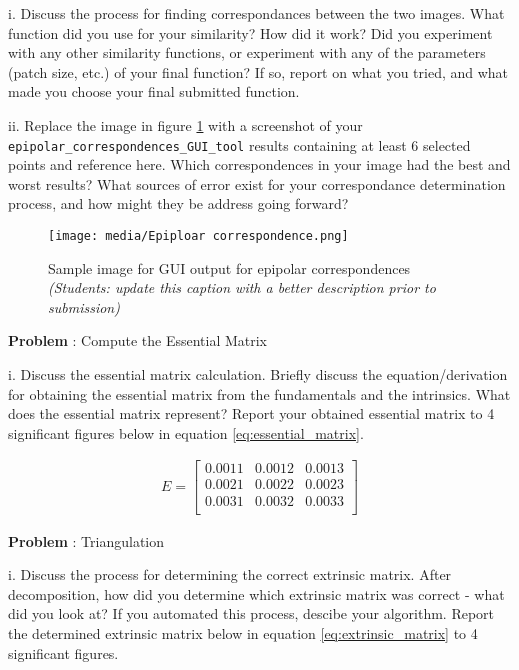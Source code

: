 \documentclass[onecolumn,10pt]{article}
\begin{document}
i. Discuss the process for finding correspondances between the two images. What function did you use for your similarity? How did it work? Did you experiment with any other similarity functions, or experiment with any of the parameters (patch size, etc.) of your final function? If so, report on what you tried, and what made you choose your final submitted function.

ii. Replace the image in figure \ref{fig:epipolar_corresp} with a screenshot of your {\tt epipolar\_correspondences\_GUI\_tool} results containing at least 6 selected points and reference here. Which correspondences in your image had the best and worst results? What sources of error exist for your correspondance determination process, and how might they be address going forward?

\begin{figure}
  \centering
  \texttt{[image: media/Epiploar correspondence.png]} %
  \caption{Sample image for GUI output for epipolar correspondences \textit{(Students: update this caption with a better description prior to submission)}}
  \label{fig:epipolar_corresp}
\end{figure}

\addtocounter{problemnumber}{1}
\noindent\textbf{Problem }:  Compute the Essential Matrix

i. Discuss the essential matrix calculation. Briefly discuss the equation/derivation for obtaining the essential matrix from the fundamentals and the intrinsics. What does the essential matrix represent? Report your obtained essential matrix to 4 significant figures below in equation \ref{eq:essential_matrix}.

\begin{align}
E=\begin{bmatrix}
0.0011 & 0.0012 & 0.0013 \\
0.0021 & 0.0022 & 0.0023 \\
0.0031 & 0.0032 & 0.0033 \\
\end{bmatrix}
\label{eq:essential_matrix}
\end{align}

\addtocounter{problemnumber}{1}
\noindent\textbf{Problem }:  Triangulation

i. Discuss the process for determining the correct extrinsic matrix. After decomposition, how did you determine which extrinsic matrix was correct - what did you look at? If you automated this process, descibe your algorithm. Report the determined extrinsic matrix below in equation \ref{eq:extrinsic_matrix} to 4 significant figures.
\end{document}
